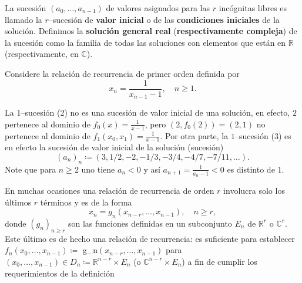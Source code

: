 \documentclass{amsart}
\begin{document}
La sucesión $\left(a_{0},\ldots,a_{n-1}\right)$ de valores asignados para las $r$ incógnitas libres es llamado la $r$--sucesión de \textbf{valor inicial} o de las \textbf{condiciones iniciales} de la solución. Definimos la \textbf{solución general real} (\textbf{respectivamente compleja}) de la sucesión como la familia de todas las soluciones con elementos que están en $\mathds{R}$ (respectivamente, en $\mathds{C}$).

\begin{example}
	Considere la relación de recurrencia de primer orden definida por \[ x_{n}=\frac{1}{x_{n-1}-1},\quad n\geq1. \]
\end{example}
La $1$--sucesión (2) no es una sucesión de valor inicial de una solución, en efecto, $2$ pertenece al dominio de $f_{0}\left(x\right)=\frac{1}{x-1}$, pero $\left(2,f_{0}(2)\right)=\left(2,1\right)$ no pertenece al dominio de $f_{1}\left(x_{0},x_{1}\right)=\frac{1}{x-1}$. Por otra parte, la $1$--sucesión (3) es en efecto la sucesión de valor inicial de la solución (sucesión) \[ \left(a_{n}\right)_{n}\coloneqq\left(3,1/2,-2,-1/3,-3/4,-4/7,-7/11,\ldots\right). \]
Note que para $n\geq2$ uno tiene $a_{n}<0$ y así $a_{n+1}=\frac{1}{a_{n}-1}<0$ es distinto de $1$.

\begin{example}
	En muchas ocasiones una relación de recurrencia de orden $r$ involucra solo los últimos $r$ términos y es de la forma \[ x_{n}=g_{n}\left(x_{n-r},\ldots,x_{n-1}\right),\quad n\geq r, \] donde ${\left(g_{n}\right)}_{n\geq r}$ son las funciones definidas en un subconjunto $E_{n}$ de $\mathds{R}^{r}$ o $\mathds{C}^{r}$. Este último es de hecho una relación de recurrencia: es suficiente para establecer $f_{n}\left(x_{0},\ldots,x_{n-1}\right)$$\coloneqq$ g_{n}$\left(x_{n-r},\ldots,x_{n-1}\right)$ para $\left(x_{0},\ldots,x_{n-1}\right)\in D_{n}\coloneqq\mathds{R}^{n-r}\times E_{n}$ (o $\mathds{C}^{n-r}\times E_{n}$) a fin de cumplir los requerimientos de la definición %
\end{example}
\end{document}
